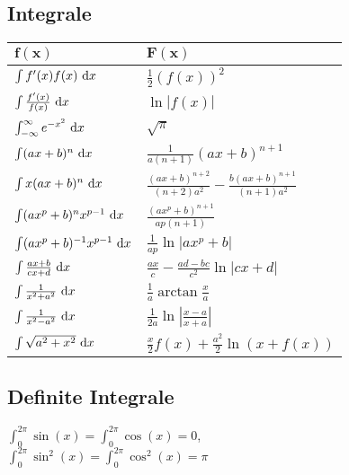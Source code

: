 \subsection{Integrale}

\begin{center}
  \begin{tabularx}{\linewidth}{>{\centering\arraybackslash}X>{\centering\arraybackslash}X}
    \toprule
    $\mathbf{f(x)}$                      & $\mathbf{F(x)}$                                                  \\
    \midrule
    $\int f'(x) f(x) \text{ d}x$                & $\frac{1}{2}(f(x))^2$                                            \\
    $\int \frac{f'(x)}{f(x)} \text{ d}x$        & $\ln|f(x)|$                                                      \\
    $\int_{-\infty}^\infty e^{-x^2} \text{ d}x$ & $\sqrt{\pi}$                                                     \\
    $\int (ax+b)^n \text{ d}x$                  & $\frac{1}{a(n+1)}(ax+b)^{n+1}$                                   \\
    $\int x(ax+b)^n \text{ d}x$                 & $\frac{(ax+b)^{n+2}}{(n+2)a^2} - \frac{b(ax+b)^{n+1}}{(n+1)a^2}$ \\
    $\int (ax^p+b)^n x^{p-1} \text{ d}x$        & $\frac{(ax^p+b)^{n+1}}{ap(n+1)}$                                 \\
    $\int (ax^p + b)^{-1} x^{p-1} \text{ d}x$   & $\frac{1}{ap} \ln |ax^p + b|$                                    \\
    $\int \frac{ax+b}{cx+d} \text{ d}x$         & $\frac{ax}{c} - \frac{ad-bc}{c^2} \ln |cx +d|$                   \\
    $\int \frac{1}{x^2+a^2} \text{ d}x$         & $\frac{1}{a} \arctan \frac{x}{a}$                                \\
    $\int \frac{1}{x^2 - a^2} \text{ d}x$       & $\frac{1}{2a} \ln\left| \frac{x-a}{x+a} \right|$                 \\
    $\int \sqrt{a^2+x^2} \text{ d}x $           & $\frac{x}{2}f(x) + \frac{a^2}{2}\ln(x+f(x))$                     \\
    \bottomrule
  \end{tabularx}
\end{center}

\subsection{Definite Integrale}
\begin{center}
  $\int_0^{2\pi}\sin(x)=\int_0^{2\pi}\cos(x)=0$, \\$\int_0^{2\pi}\sin^2(x)=\int_0^{2\pi}\cos^2(x)=\pi$
\end{center}

